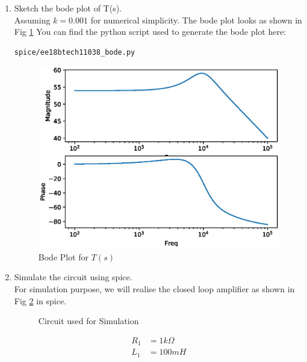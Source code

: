 \begin{enumerate}[label=\arabic*.,ref=\theenumi]
\item Sketch the bode plot of T(s).\\
\solution Assuming $k=0.001$ for numerical simplicity.
The bode plot looks as shown in Fig \ref{fig:ee18btech11038_bode}
You can find the python script used to generate the bode plot here:
\begin{lstlisting}
spice/ee18btech11038_bode.py
\end{lstlisting}
\begin{figure}[!ht]
\centering
\includegraphics[width=\columnwidth]{./figs/ee18btech11038_bode.eps}
\caption{Bode Plot for $T(s)$}
\label{fig:ee18btech11038_bode}
\end{figure}

\item Simulate the circuit using spice.\\
\solution For simulation purpose, we will realise the closed loop amplifier as shown in Fig \ref{fig:ee18btech11038_sim} in spice.


\begin{figure}[!ht]
	\begin{center}
		
		\resizebox{\columnwidth}{!}{}
	\end{center}
\caption{Circuit used for Simulation}
\label{fig:ee18btech11038_sim}
\end{figure}

\begin{align}
    R_{1}&= 1k\Omega \\
    L_{1}&= 100mH
\end{align}


\end{enumerate}
